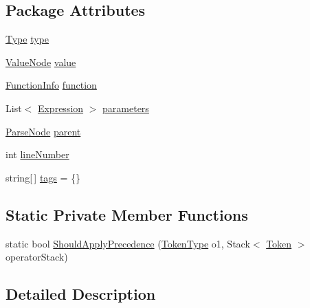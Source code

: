 \subsection*{Package Attributes}
\begin{DoxyCompactItemize}
\item 
\hyperlink{a00080_aceddb5496ccffe668bced2d131e4bf86}{Type} \hyperlink{a00080_ad55c92df835006328bc2a79a8f91efb9}{type}
\item 
\hyperlink{a00162}{Value\-Node} \hyperlink{a00080_a569e516782891544c334ff8131b23108}{value}
\item 
\hyperlink{a00082}{Function\-Info} \hyperlink{a00080_a9c1859ce5ad4c86ded8dd0d61da61320}{function}
\item 
List$<$ \hyperlink{a00080}{Expression} $>$ \hyperlink{a00080_a7b21380bead8ae08b2cfc6594edab32c}{parameters}
\item 
\hyperlink{a00120}{Parse\-Node} \hyperlink{a00120_af313a82103fcc2ff5a177dbb06b92f7b}{parent}
\item 
int \hyperlink{a00120_a18b493382de0fde5b4299c1bd2250075}{line\-Number}
\item 
string\mbox{[}$\,$\mbox{]} \hyperlink{a00120_a58b3a15788fd2d4127d73619dc6d04ae}{tags} = \{\}
\end{DoxyCompactItemize}
\subsection*{Static Private Member Functions}
\begin{DoxyCompactItemize}
\item 
static bool \hyperlink{a00080_a5004a8eaa00b2b55856ecb4f339033fb}{Should\-Apply\-Precedence} (\hyperlink{a00029_a301aa7c866593a5b625a8fc158bbeace}{Token\-Type} o1, Stack$<$ \hyperlink{a00147}{Token} $>$ operator\-Stack)
\end{DoxyCompactItemize}


\subsection{Detailed Description}


